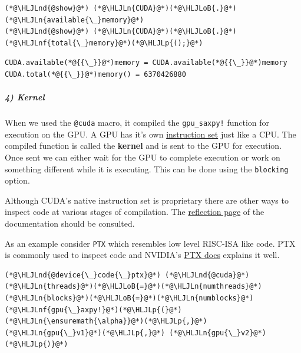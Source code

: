 \documentclass[12pt,a4paper]{article}
\newcommand{\HLJLn}[1]{#1}
\newcommand{\HLJLnd}[1]{\textcolor[RGB]{214,102,97}{#1}}
\newcommand{\HLJLnf}[1]{\textcolor[RGB]{66,102,213}{#1}}
\newcommand{\HLJLoB}[1]{\textcolor[RGB]{102,102,102}{\textbf{#1}}}
\newcommand{\HLJLp}[1]{#1}
\begin{document}
\begin{lstlisting}
(*@\HLJLnd{@show}@*) (*@\HLJLn{CUDA}@*)(*@\HLJLoB{.}@*)(*@\HLJLn{available{\_}memory}@*) 
(*@\HLJLnd{@show}@*) (*@\HLJLn{CUDA}@*)(*@\HLJLoB{.}@*)(*@\HLJLnf{total{\_}memory}@*)(*@\HLJLp{();}@*)
\end{lstlisting}

\begin{lstlisting}
CUDA.available(*@{{\_}}@*)memory = CUDA.available(*@{{\_}}@*)memory
CUDA.total(*@{{\_}}@*)memory() = 6370426880
\end{lstlisting}


\subparagraph{4) Kernel}
When we used the \texttt{@cuda} macro, it compiled the \texttt{gpu\_saxpy!} function for execution on the GPU. A GPU has it's own \href{https://simple.wikipedia.org/wiki/Instruction_set}{instruction set} just like a CPU. The compiled function is called the \textbf{kernel} and is sent to the GPU for execution. Once sent we can either wait for the GPU to complete execution or work on something different while it is executing. This can be done using the \texttt{blocking} option.

Although CUDA's native instruction set is proprietary there are other ways to inspect code at various stages of compilation. The \href{https://juliagpu.gitlab.io/CUDA.jl/api/compiler/#Reflection}{reflection page} of the documentation should be consulted.

As an example consider \texttt{PTX} which resembles low level RISC-ISA like code. PTX is commonly used to inspect code and NVIDIA's \href{https://docs.nvidia.com/cuda/parallel-thread-execution/index.html#introduction}{PTX docs} explains it well.


\begin{lstlisting}
(*@\HLJLnd{@device{\_}code{\_}ptx}@*) (*@\HLJLnd{@cuda}@*) (*@\HLJLn{threads}@*)(*@\HLJLoB{=}@*)(*@\HLJLn{numthreads}@*) (*@\HLJLn{blocks}@*)(*@\HLJLoB{=}@*)(*@\HLJLn{numblocks}@*) (*@\HLJLnf{gpu{\_}axpy!}@*)(*@\HLJLp{(}@*)(*@\HLJLn{\ensuremath{\alpha}}@*)(*@\HLJLp{,}@*) (*@\HLJLn{gpu{\_}v1}@*)(*@\HLJLp{,}@*) (*@\HLJLn{gpu{\_}v2}@*)(*@\HLJLp{)}@*)
\end{lstlisting}
\end{document}
